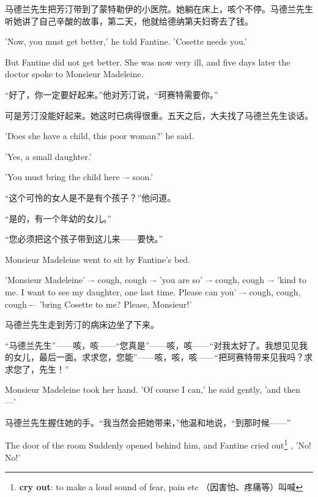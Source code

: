 \documentclass[fontset=ubuntu, zihao=5]{ctexart}
\begin{document}
\begin{paracol}{2}
  \switchcolumn

  马德兰先生把芳汀带到了蒙特勒伊的小医院。她躺在床上，咳个不停。马德兰先生听她讲了自己辛酸的故事，第二天，他就给德纳第夫妇寄去了钱。

  \switchcolumn*

  'Now, you must get better,' he told Fantine. 'Cosette needs you.'


  But Fantine did not get better. She was now very ill, and five days later the doctor spoke to Monsieur Madeleine.

  \switchcolumn

  “好了，你一定要好起来。”他对芳汀说，“珂赛特需要你。”


  可是芳汀没能好起来。她这时已病得很重。五天之后，大夫找了马德兰先生谈话。

  \switchcolumn*

  'Does she have a child, this poor woman?' he said.


  'Yes, a small daughter.'


  'You must bring the child here –- soon.'

  \switchcolumn

  “这个可怜的女人是不是有个孩子？”他问道。


  “是的，有一个年幼的女儿。”


  “您必须把这个孩子带到这儿来——要快。”

  \switchcolumn*

  Monsieur Madeleine went to sit by Fantine's bed.

  'Monsieur Madeleine' –- cough, cough –- 'you are so' –- cough, cough –- 'kind to me. I want to see my daughter, one last time. Please can you' –- cough, cough, cough -– 'bring Cosette to me? Please, Monsieur!'

  \switchcolumn

  马德兰先生走到芳汀的病床边坐了下来。


  “马德兰先生”——咳，咳——“您真是”——咳，咳——“对我太好了。我想见见我的女儿，最后一面。求求您，您能”——咳，咳，咳——“把珂赛特带来见我吗？求求您了，先生！”

  \switchcolumn*

  Monsieur Madeleine took her hand. 'Of course I can,' he said gently, 'and
  then ---'

  \switchcolumn

  马德兰先生握住她的手。“我当然会把她带来，”他温和地说，“到那时候——”

  \switchcolumn*

  The door of the room Suddenly opened behind him, and Fantine cried out\footnote{\textbf{cry out}: to make a loud sound of fear, pain etc （因害怕、疼痛等）叫喊}
  , 'No! No!'


\end{paracol}
\end{document}

